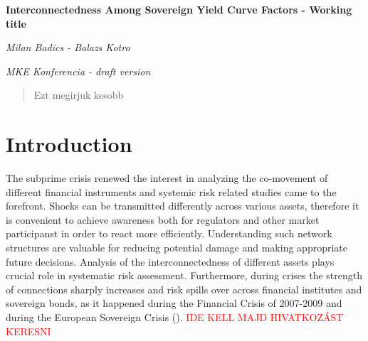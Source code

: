 \documentclass[12pt,bibliography=totoc]{article}
\begin{document}
\begin{titlepage}




 \begin{center}
\Huge\textbf{Interconnectedness Among Sovereign Yield Curve Factors - Working title}\\
 
\vspace{3cm}


 \Large\textit{Milan Badics - Balazs Kotro}
 
 \vspace{3cm}
 
\Large\textit{MKE Konferencia - draft version}


\vspace{4cm}
\end{center}

\begin{abstract}
Ezt megirjuk kesobb
\end{abstract}


\end{titlepage}

\newpage

\section{Introduction}

The subprime crisis renewed the interest in analyzing the co-movement of different financial instruments and systemic risk related studies came to the forefront. Shocks can be transmitted differently across various assets, therefore it is convenient to achieve awareness both for regulators and other market participanst in order to react more efficiently. Understanding such network structures are valuable for reducing potential damage and making appropriate future decisions. Analysis of the interconnectedness of different assets plays crucial role in systematic risk assessment. Furthermore, during crises the strength of connections sharply increases and risk spills over across financial institutes and sovereign bonds, as it happened during the Financial Crisis of 2007-2009 and during the European Sovereign Crisis (\cite{diebold2012better}). \textcolor{red}{IDE KELL MAJD HIVATKOZÁST KERESNI}
\end{document}

